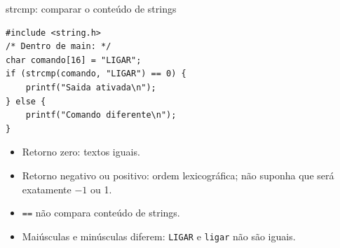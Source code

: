\begin{frame}[fragile]{strcmp: comparar o conteúdo de strings}
\begin{lstlisting}
#include <string.h>
/* Dentro de main: */
char comando[16] = "LIGAR";
if (strcmp(comando, "LIGAR") == 0) {
    printf("Saida ativada\n");
} else {
    printf("Comando diferente\n");
}
\end{lstlisting}
\begin{itemize}
\item Retorno zero: textos iguais.
\item Retorno negativo ou positivo: ordem lexicográfica; não suponha que será exatamente $-1$ ou 1.
\item \texttt{==} não compara conteúdo de strings.
\item Maiúsculas e minúsculas diferem: \texttt{LIGAR} e \texttt{ligar} não são iguais.
\end{itemize}
\end{frame}
